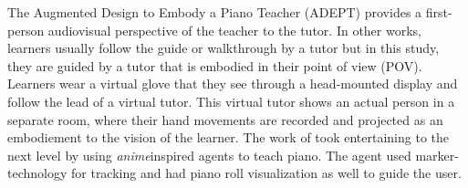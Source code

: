 \documentclass[sigchi, review]{acmart}
\begin{document}

The Augmented Design to Embody a Piano Teacher (ADEPT) \cite{gerry2019adept} provides a first-person audiovisual perspective of the teacher to the tutor. In other works, learners usually follow the guide or walkthrough by a tutor but in this study, they are guided by a tutor that is embodied in their point of view (POV). Learners wear a virtual glove that they see through a head-mounted display and follow the lead of a virtual tutor. This virtual tutor shows an actual person in a separate room, where their hand movements are recorded and projected as an embodiement to the vision of the learner. The work of \cite{goodwin2013key} took entertaining to the next level by using \textit{anime}\textendash inspired agents to teach piano. The agent used marker-technology for tracking and had piano roll visualization as well to guide the user. 
\end{document}

